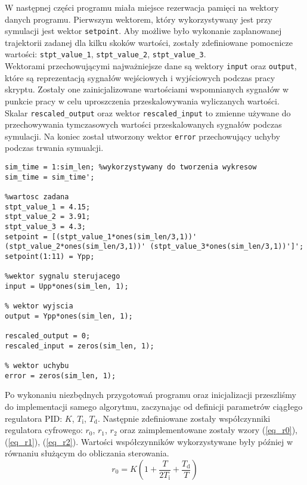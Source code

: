 W następnej części programu miała miejsce rezerwacja pamięci na wektory danych programu. Pierwszym wektorem, który wykorzystywany jest przy symulacji jest wektor \verb+setpoint+. Aby możliwe było wykonanie zaplanowanej trajektorii zadanej dla kilku skoków wartości, zostały zdefiniowane pomocnicze wartości: \verb+stpt_value_1+, \verb+stpt_value_2+, \verb+stpt_value_3+.\\
\indent{} Wektorami przechowującymi najważniejsze dane są wektory \verb+input+ oraz \verb+output+, które są reprezentacją sygnałów wejściowych i wyjściowych podczas pracy skryptu. Zostały one zainicjalizowane wartościami wspomnianych sygnałów w punkcie pracy w celu uproszczenia przeskalowywania wyliczanych wartości.\\ 
\indent{} Skalar \verb+rescaled_output+ oraz wektor \verb+rescaled_input+ to zmienne używane do przechowywania tymczasowych wartości przeskalowanych sygnałów podczas symulacji. Na koniec został utworzony wektor \verb+error+ przechowujący uchyby podczas trwania symualcji.

\begin{lstlisting}[style=custommatlab,frame=single,label={zad4_wek_lst},caption={Inicjalizacja wektorów},captionpos=b]
%czas symulacji
sim_time = 1:sim_len; %wykorzystywany do tworzenia wykresow
sim_time = sim_time';

%wartosc zadana
stpt_value_1 = 4.15;
stpt_value_2 = 3.91;
stpt_value_3 = 4.3;
setpoint = [(stpt_value_1*ones(sim_len/3,1))' (stpt_value_2*ones(sim_len/3,1))' (stpt_value_3*ones(sim_len/3,1))']';
setpoint(1:11) = Ypp;

%wektor sygnalu sterujacego
input = Upp*ones(sim_len, 1);

% wektor wyjscia
output = Ypp*ones(sim_len, 1);

rescaled_output = 0;
rescaled_input = zeros(sim_len, 1);

% wektor uchybu
error = zeros(sim_len, 1);
\end{lstlisting}

Po wykonaniu niezbędnych przygotowań programu oraz inicjalizacji przeszliśmy do implementacji samego algorytmu, zaczynając od definicji parametrów ciągłego regulatora PID: $K$, $T_\mathrm{i}$, $T_\mathrm{d}$. Następnie zdefiniowane zostały współczynniki regulatora cyfrowego: $r_0$, $r_1$, $r_2$ oraz zaimplementowane zostały wzory (\ref{eq_r0}), (\ref{eq_r1}), (\ref{eq_r2}). Wartości współczynników wykorzystywane były później w równaniu służącym do obliczania sterowania.
\\
\begin{equation}
\label{eq_r0}
r_{0} = K (1 + \frac{T}{2 T_{\mathrm{i}}} + \frac{T_{\mathrm{d}}}{T})
\end{equation}

